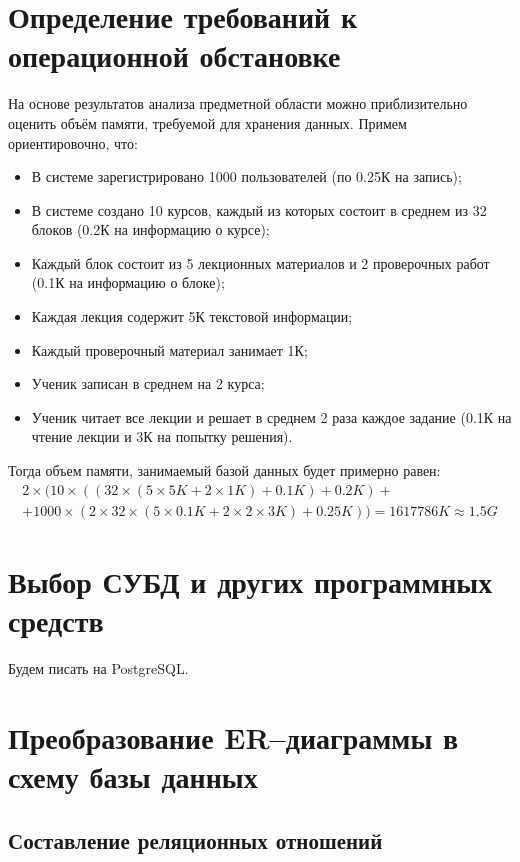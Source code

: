 \documentclass[a4paper,14pt]{article}
\begin{document}
\section{Определение требований к операционной обстановке}
На основе результатов анализа предметной области можно приблизительно оценить объём памяти, требуемой для хранения данных.
Примем ориентировочно, что:
\begin{itemize}
	\item В системе зарегистрировано 1000 пользователей (по 0.25К на запись);
	\item В системе создано 10 курсов, каждый из которых состоит в среднем из 32 блоков (0.2К на информацию о курсе);
	\item Каждый блок состоит из 5 лекционных материалов и 2 проверочных работ (0.1К на информацию о блоке);
	\item Каждая лекция содержит 5К текстовой информации;
	\item Каждый проверочный материал занимает 1К;
	\item Ученик записан в среднем на 2 курса;
	\item Ученик читает все лекции и решает в среднем 2 раза каждое задание (0.1К на чтение лекции и 3К на попытку решения).
\end{itemize}

Тогда объем памяти, занимаемый базой данных будет примерно равен:
\begin{multline*}
2 \times( 10 \times ((32 \times (5 \times 5K + 2 \times 1K) + 0.1K) + 0.2K) + \\ 
+ 1000 \times (2 \times 32 \times (5 \times 0.1K + 2 \times 2 \times 3K) + 0.25K)) = 1617786K	\approx 1.5G
\end{multline*}

\section{Выбор СУБД и других программных средств}
Будем писать на PostgreSQL.

\section{Преобразование ER–диаграммы в схему базы данных}

\subsection{Составление реляционных отношений}
\end{document}
